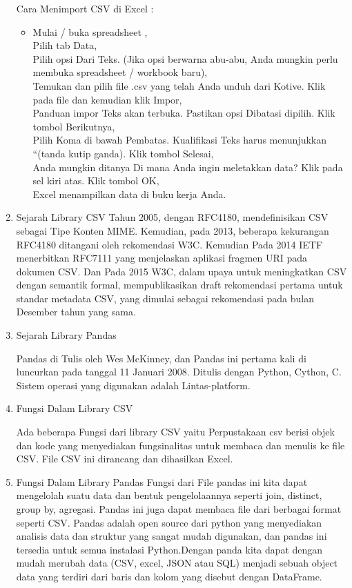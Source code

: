 \begin{enumerate}
Cara Menimport CSV di Excel : \\
\begin{itemize}
\item Mulai / buka spreadsheet ,\\
Pilih tab Data,\\
Pilih opsi Dari Teks. (Jika opsi berwarna abu-abu, Anda mungkin perlu membuka spreadsheet / workbook baru),\\
Temukan dan pilih file .csv yang telah Anda unduh dari Kotive. Klik pada file dan kemudian klik Impor,\\
Panduan impor Teks akan terbuka. Pastikan opsi Dibatasi dipilih. Klik tombol Berikutnya,\\
Pilih Koma di bawah Pembatas. Kualifikasi Teks harus menunjukkan “(tanda kutip ganda). Klik tombol Selesai,\\
Anda mungkin ditanya Di mana Anda ingin meletakkan data? Klik pada sel kiri atas. Klik tombol OK,\\
Excel menampilkan data di buku kerja Anda.
\end{itemize}

\item Sejarah Library CSV
Tahun 2005, dengan RFC4180, mendefinisikan CSV sebagai Tipe Konten MIME. Kemudian, pada 2013, 
beberapa kekurangan RFC4180 ditangani oleh rekomendasi W3C. Kemudian Pada 2014 IETF menerbitkan RFC7111 
yang menjelaskan aplikasi fragmen URI pada dokumen CSV. Dan Pada 2015 W3C, dalam upaya untuk meningkatkan CSV dengan semantik formal, 
mempublikasikan draft rekomendasi pertama untuk standar metadata CSV, yang dimulai sebagai rekomendasi pada bulan Desember tahun yang sama.
\item Sejarah Library Pandas 

Pandas di Tulis oleh  Wes McKinney, dan Pandas ini pertama kali di luncurkan pada tanggal 11 Januari 2008. 
Ditulis dengan Python, Cython, C. Sistem operasi  yang digunakan adalah Lintas-platform.

\item Fungsi Dalam Library CSV

Ada beberapa Fungsi dari library CSV yaitu Perpustakaan csv berisi objek dan kode yang  menyediakan fungsinalitas untuk membaca dan menulis ke file CSV.  
File CSV ini dirancang dan dihasilkan Excel. 

\item Fungsi Dalam Library Pandas 
Fungsi dari File pandas ini kita dapat mengelolah suatu data dan bentuk pengelolaannya seperti join, distinct, group by, agregasi. 
Pandas ini juga dapat membaca file dari berbagai format seperti CSV. 
Pandas adalah open source dari python yang menyediakan analisis data dan struktur yang sangat mudah digunakan, 
dan pandas ini tersedia untuk semua instalasi Python.Dengan panda kita dapat dengan mudah merubah data (CSV, excel, JSON atau SQL) 
menjadi sebuah object data yang terdiri dari baris dan kolom yang disebut dengan DataFrame. 


\end{enumerate}

